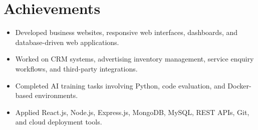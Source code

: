 \documentclass[a4paper,10pt]{article}
\begin{document}
\section*{Achievements}
\vspace{2pt}
\begin{itemize}
    \item Developed business websites, responsive web interfaces, dashboards, and database-driven web applications.
    \item Worked on CRM systems, advertising inventory management, service enquiry workflows, and third-party integrations.
    \item Completed AI training tasks involving Python, code evaluation, and Docker-based environments.
    \item Applied React.js, Node.js, Express.js, MongoDB, MySQL, REST APIs, Git, and cloud deployment tools.
\end{itemize}
\end{document}
